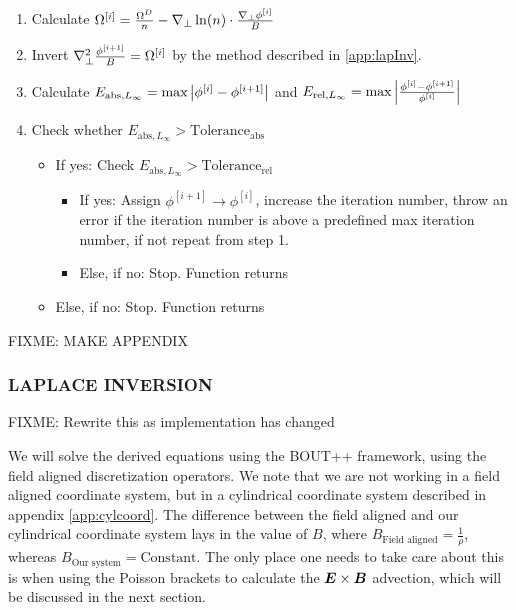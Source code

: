 \begin{algorithm}
\begin{enumerate}
    \item Calculate
        $ \Omega^{[i]} = \frac{\Omega^D}{n} -
        \nabla_\perp \ln(n) \cdot\frac{\nabla_\perp\phi^{[i]}}{B}
        $
    \item Invert $\nabla_\perp^2 \frac{\phi^{[i+1]}}{B} = \Omega^{[i]}$ by the method
        described in \ref{app:lapInv}.
    \item Calculate
        $E_{\text{abs}, L_\infty} = \text{max} \left|\phi^{[i]} - \phi^{[i+1]}\right|$
        and
        $E_{\text{rel}, L_\infty} = \text{max} \left|\frac{\phi^{[i]} - \phi^{[i+1]}}{\phi^{[i]}}\right|$
    \item Check whether $E_{\text{abs}, L_\infty} > \text{Tolerance}_\text{abs}$
    \begin{itemize}[noitemsep,nolistsep]
        \item If yes: Check $E_{\text{abs}, L_\infty} > \text{Tolerance}_\text{rel}$
            \begin{itemize}[noitemsep,nolistsep]
                \item If yes: Assign $\phi^{[i+1]} \to \phi^{[i]}$, increase the
                    iteration number, throw an error if the iteration number is
                    above a predefined max iteration number, if not repeat from
                    step 1.
                \item Else, if no: Stop. Function returns
            \end{itemize}
        \item Else, if no: Stop. Function returns
    \end{itemize}
\end{enumerate}
\end{algorithm}
%



FIXME: MAKE APPENDIX
\subsubsection{LAPLACE INVERSION}



%
FIXME: Rewrite this as implementation has changed

%
We will solve the derived equations using the BOUT++ framework, using the field
aligned discretization operators. We note that we are not working in a field
aligned coordinate system, but in a cylindrical coordinate system described in
appendix \ref{app:cylcoord}. The difference between the field aligned and our
cylindrical coordinate system lays in the value of $B$, where $B_\text{Field
    aligned}=\frac{1}{\rho}$, whereas $B_\text{Our system}=\text{Constant}$.
The only place one needs to take care about this is when using the Poisson
brackets to calculate the $\boldsymbol{E}\times \boldsymbol{B}$ advection, which will be
discussed in the next section.


